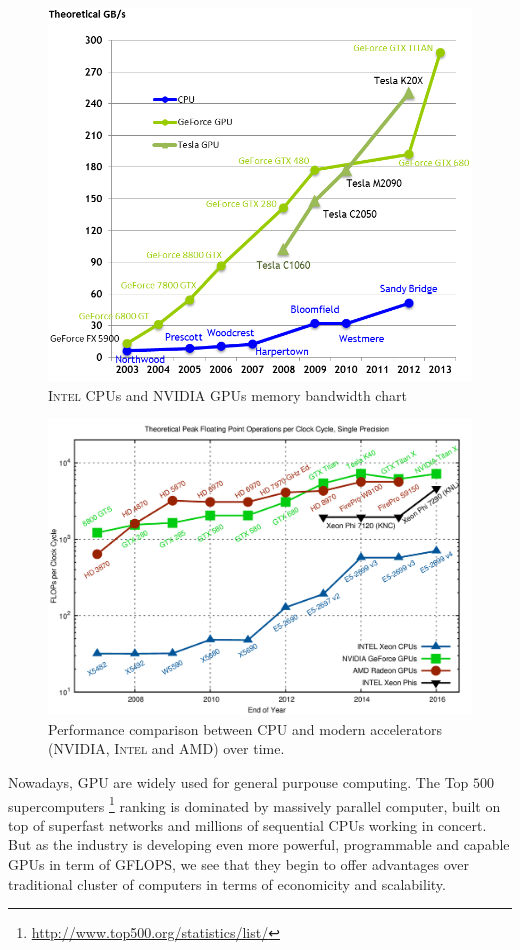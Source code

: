     \begin{figure}
    	\centering
    	\includegraphics[width=1.0\textwidth]{./images/parallel_programming/memory-bandwidth}
    	\caption{\textsc{Intel} CPUs and \textsc{NVIDIA} GPUs memory bandwidth
    		chart}\label{CPU-VS-GPU_MEMORY}
    \end{figure}
    \begin{figure}
    	\centering
    	\includegraphics[width=1.0\textwidth]{./images/parallel_programming/cpu-vs-gpu}
    	\caption{Performance comparison between CPU and modern accelerators (\textsc{NVIDIA}, \textsc{Intel} and \textsc{AMD}) over time.}\label{CPU-VS-GPU_GFLOP}
    \end{figure}
    Nowadays, GPU are widely used for general purpouse computing. The Top $500$ supercomputers \cite{Strohmaier:2006:TS:1188455.1188474} \footnote{\url{http://www.top500.org/statistics/list/}} ranking is dominated by massively parallel computer, built on top of superfast networks and millions of sequential CPUs working in concert.
    But as the industry is developing even more powerful, programmable and capable GPUs in term of \si{\giga FLOPS},  we see that they begin to offer advantages over traditional cluster of computers in terms of economicity and scalability.
    
